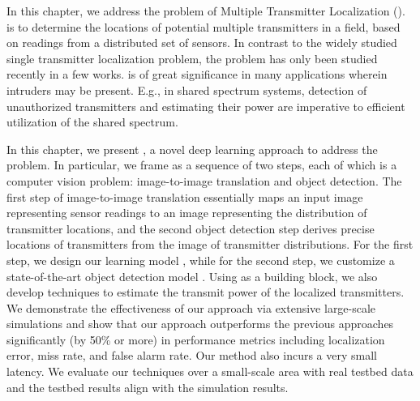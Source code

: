 In this chapter, we address the problem of Multiple Transmitter Localization (\mtl).
\mtl is to determine the
locations of potential multiple transmitters in a field, based on readings from a distributed set of sensors.
In contrast to the widely studied single transmitter localization problem, the \mtl problem has only been studied recently in a few works.
\mtl is of great significance in many applications wherein intruders
may be present. E.g., in shared spectrum systems, detection of unauthorized transmitters and estimating their power are imperative to 
efficient utilization of the shared spectrum.
	
In this chapter, we present \our, a novel deep learning approach to address the \mtl problem.  
In particular, we frame
\mtl as a sequence of two steps, each of which is a computer vision problem: image-to-image translation and object detection. 
The first step of image-to-image translation essentially maps an input image representing sensor readings to an 
image representing the distribution of transmitter locations, and the second object detection step derives precise
locations of transmitters from the image of transmitter distributions.
For the first step, we design our learning model \imgimg, while for the second step, we customize a 
state-of-the-art object detection model \yolocust. 
Using  \our as a building block, we also develop techniques to estimate the transmit power of the localized transmitters.
We demonstrate the effectiveness of our approach
via extensive large-scale simulations and show that our approach outperforms the previous approaches 
significantly (by 50\% or more) in performance metrics including localization error, miss rate, and false alarm rate. 
Our method also incurs a very small latency.
We evaluate our techniques over a small-scale area with real testbed data and the testbed results align with the simulation results.
